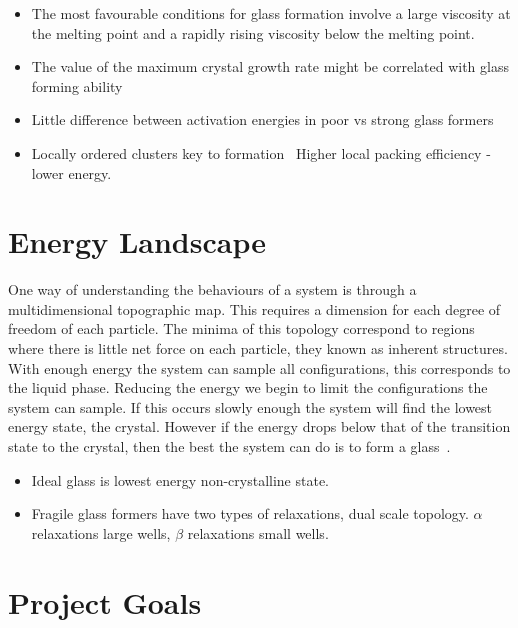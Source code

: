 {\begin{itemize}
    \item The most favourable conditions for glass formation involve a large viscosity at the melting point and a rapidly rising viscosity below the melting point.~\cite{uhlmann:72}



    \item The value of the maximum crystal growth rate might be correlated with glass forming ability~\cite{tang:13}

    \item Little difference between activation energies in poor vs strong glass formers~\cite{tang:13}

    \item Locally ordered clusters key to formation~\cite{yang:12} Higher local packing efficiency - lower energy. 
\end{itemize}

\section{Energy Landscape}
One way of understanding the behaviours of a system is through a multidimensional topographic map. This requires a dimension for each degree of freedom of each particle. The minima of this topology correspond to regions where there is little net force on each particle, they known as inherent structures. With enough energy the system can sample all configurations, this corresponds to the liquid phase. Reducing the energy we begin to limit the configurations the system can sample. If this occurs slowly enough the system will find the lowest energy state, the crystal. However if the energy drops below that of the transition state to the crystal, then the best the system can do is to form a glass~\cite{stillinger:95}. 

\begin{figure}
\end{figure}

\begin{itemize}
    \item Ideal glass is lowest energy non-crystalline state.
    \item Fragile glass formers have two types of relaxations, dual scale topology. $\alpha$ relaxations large wells, $\beta$ relaxations small wells.~\cite{stillinger:95}
\end{itemize}


\section{Project Goals}

}
